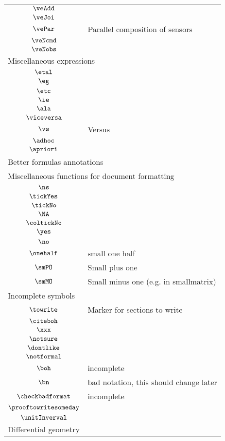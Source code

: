 \begin{longtable}{cl}
 $\veAdd$ & \\ 
 $\veJoi$ & \\ 
 $\vePar$ &  Parallel composition of sensors\\ 
 $\veNcmd$ & \\ 
 $\veNobs$ & \\ 
 \multicolumn{2}{l}{Miscellaneous expressions}\\ 
 \hline
$\etal$ & \\ 
 $\eg$ & \\ 
 $\etc$ & \\ 
 $\ie$ & \\ 
 $\ala$ & \\ 
 $\viceversa$ & \\ 
 $\vs$ &  Versus\\ 
 $\adhoc$ & \\ 
 $\apriori$ & \\ 
 \multicolumn{2}{l}{Better formulas annotations}\\ 
 \hline
\multicolumn{2}{l}{Miscellaneous functions for document formatting}\\ 
 \hline
$\ns$ & \\ 
 $\tickYes$ & \\ 
 $\tickNo$ & \\ 
 $\NA$ & \\ 
 $\coltickNo$ & \\ 
 $\yes$ & \\ 
 $\no$ & \\ 
 $\onehalf$ &  small one half\\ 
 $\smPO$ &  Small plus one \\ 
 $\smMO$ &  Small minus one (e.g. in smallmatrix)\\ 
 \multicolumn{2}{l}{Incomplete symbols}\\ 
 \hline
$\towrite$ &  Marker for sections to write\\ 
 $\citeboh$ & \\ 
 $\xxx$ & \\ 
 $\notsure$ & \\ 
 $\dontlike$ & \\ 
 $\notformal$ & \\ 
 $\boh$ &  incomplete\\ 
 $\bn$ &  bad notation, this should change later\\ 
 $\checkbadformat$ &  incomplete\\ 
 $\prooftowritesomeday$ & \\ 
 $\unitInverval$ & \\ 
 \multicolumn{2}{l}{Differential geometry}\\ 

\end{longtable}
